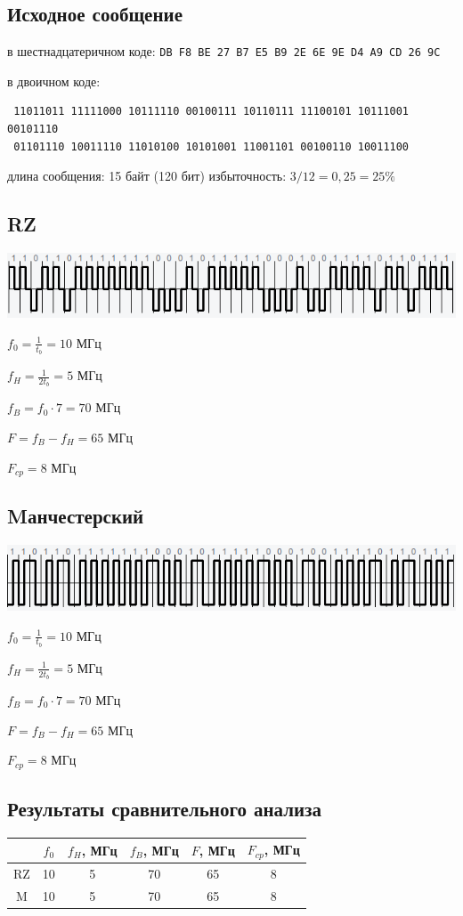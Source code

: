 \subsection{Исходное сообщение}
в шестнадцатеричном коде: \verb|DB F8 BE 27 B7 E5 B9 2E 6E 9E D4 A9 CD 26 9C|

в двоичном коде:

\begin{verbatim}
 11011011 11111000 10111110 00100111 10110111 11100101 10111001 00101110
 01101110 10011110 11010100 10101001 11001101 00100110 10011100
\end{verbatim}

длина сообщения: 15 байт (120 бит)
избыточность: $3/12 = 0,25 = 25\%$

\subsection{RZ}
\includegraphics[scale=0.7]{img/rz_redu.png}

$f_0 = \frac{1}{t_b} = 10$ МГц

$f_H = \frac{1}{2t_b} = 5$ МГц

$f_B = f_0 \cdot 7 = 70$ МГц

$F = f_B - f_H = 65$ МГц

$F_{cp} = 8$ МГц
\subsection{Mанчестерский}
\includegraphics[scale=0.7]{img/m_redu.png}

$f_0 = \frac{1}{t_b} = 10$ МГц

$f_H = \frac{1}{2t_b} = 5$ МГц

$f_B = f_0 \cdot 7 = 70$ МГц

$F = f_B - f_H = 65$ МГц

$F_{cp} = 8$ МГц
\subsection{Результаты сравнительного анализа}
\begin{table}[!h]
\begin{tabular}{|c|c|c|c|c|c|}
\hline
    & $f_0$ & $f_H$, МГц & $f_B$, МГц & $F$, МГц & $F_{cp}$, МГц \\ \hline
RZ  & 10    & 5          & 70         & 65       & 8             \\ \hline
M   & 10    & 5          & 70         & 65       & 8             \\ \hline
\end{tabular}
\end{table}

